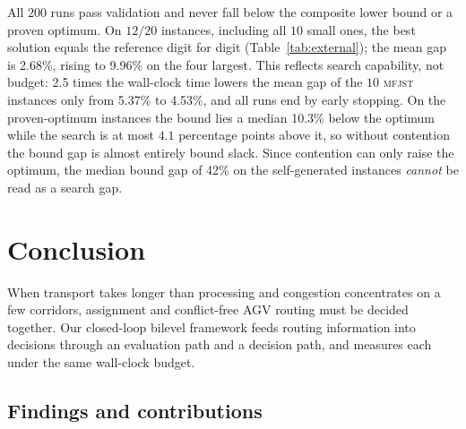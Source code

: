\documentclass[preprint,review,12pt,authoryear]{elsarticle}
\newcommand{\NSeeds}{10}
\newcommand{\LBGapMed}{42\%}
\newcommand{\PubNInst}{20}
\newcommand{\PubNMatch}{12}               %
\newcommand{\PubGapMean}{2.68\%}          %
\newcommand{\PubGapBig}{9.96\%}           %
\newcommand{\PubBudgetRatio}{2.5}
\newcommand{\PubGapLoBudget}{5.37\%}      %
\newcommand{\PubGapHiBudget}{4.53\%}      %
\newcommand{\PubLBSlack}{10.3\%}          %
\newcommand{\PubLBResidMax}{4.1}          %
\begin{document}
All $200$ runs pass validation and never fall below the composite lower bound or a proven optimum. On $\PubNMatch{}/\PubNInst{}$ instances, including all $10$ small ones, the best solution equals the reference digit for digit (Table~\ref{tab:external}); the mean gap is \PubGapMean{}, rising to \PubGapBig{} on the four largest. This reflects search capability, not budget: \PubBudgetRatio{} times the wall-clock time lowers the mean gap of the $10$ \textsc{mfjst} instances only from \PubGapLoBudget{} to \PubGapHiBudget{}, and all runs end by early stopping. On the proven-optimum instances the bound lies a median \PubLBSlack{} below the optimum while the search is at most $\PubLBResidMax$ percentage points above it, so without contention the bound gap is almost entirely bound slack. Since contention can only raise the optimum, the median bound gap of \LBGapMed{} on the self-generated instances \emph{cannot} be read as a search gap.

\begin{table}[!htbp]
\caption{Degenerate comparison on public benchmarks (exclusivity removed). \textsc{opt}: MILP-proven optimum; \textsc{bk}: best published value; gap from the best of \NSeeds{} seeds; asterisk: identical to the reference.}
\label{tab:external}
\centering
\small

\end{table}



\section{Conclusion}

When transport takes longer than processing and congestion concentrates on a few corridors, assignment and conflict-free AGV routing must be decided together. Our closed-loop bilevel framework feeds routing information into decisions through an evaluation path and a decision path, and measures each under the same wall-clock budget.

\subsection{Findings and contributions}
\label{sec:contributions}
\end{document}
